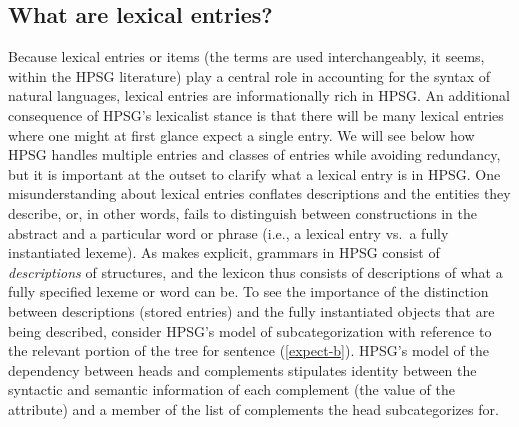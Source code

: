 \documentclass[output=paper
	        ,collection
	        ,collectionchapter
 	        ,biblatex
                ,babelshorthands
                ,newtxmath
                ,draftmode
                ,colorlinks, citecolor=brown
]{langscibook}
\begin{document}
\subsection{What are lexical entries?}

Because lexical entries or items (the terms are used interchangeably, it seems, within the HPSG literature) play a central role in accounting for the syntax of natural languages, lexical entries are informationally rich in HPSG. 
An additional consequence of HPSG's lexicalist stance is that there will be many lexical entries where one might at first glance expect a single entry. We will see below how HPSG handles multiple entries and classes of entries while avoiding redundancy, but it is important at the outset to clarify what a lexical entry is in HPSG. 
One misunderstanding about lexical entries conflates descriptions and the entities they describe, or, in other words, fails to distinguish between constructions in the abstract and a particular word or phrase (i.e., a lexical entry vs.\ a fully instantiated lexeme). 
As  makes explicit, grammars in HPSG consist of \emph{descriptions} of structures, and the lexicon thus consists of descriptions of what a fully specified lexeme or word can be. 
To see the importance of the distinction between descriptions (stored entries) and the fully instantiated objects that are being described, consider HPSG's model of subcategorization with reference to the relevant portion of the tree for sentence (\ref{expect-b}). 
HPSG's model of the dependency between heads and complements stipulates identity between the syntactic and semantic information of each complement (the value of the  attribute) and a member of the list of complements the head subcategorizes for. 
\end{document}

